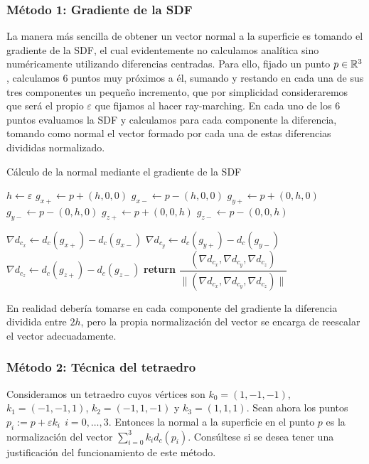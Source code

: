 \subsubsection{Método 1: Gradiente de la SDF}

La manera más sencilla de obtener un vector normal a la superficie es tomando el gradiente de la SDF, el cual evidentemente no calculamos analítica sino numéricamente utilizando diferencias centradas. Para ello, fijado un punto $p\in\mathbb{R}^3$, calculamos 6 puntos muy próximos a él, sumando y restando en cada una de sus tres componentes un pequeño incremento, que por simplicidad consideraremos que será el propio $\varepsilon$ que fijamos al hacer ray-marching. En cada uno de los 6 puntos evaluamos la SDF y calculamos para cada componente la diferencia, tomando como normal el vector formado por cada una de estas diferencias divididas normalizado.

\begin{algorithm}[H]
    \caption{Cálculo de la normal mediante el gradiente de la SDF} \label{alg:normal-gradiente-sdf}
    \begin{algorithmic}
    \State $h\gets\varepsilon$
    \State $g_{x+}\gets p + (h,0,0)$
    \State $g_{x-}\gets p - (h,0,0)$
    \State $g_{y+}\gets p + (0,h,0)$
    \State $g_{y-}\gets p - (0,h,0)$
    \State $g_{z+}\gets p + (0,0,h)$
    \State $g_{z-}\gets p - (0,0,h)$

    \State $\nabla d_{c_x} \gets d_c(g_{x+})-d_c(g_{x-})$
    \State $\nabla d_{c_y} \gets d_c(g_{y+})-d_c(g_{y-})$
    \State $\nabla d_{c_z} \gets d_c(g_{z+})-d_c(g_{z-})$
        \State \textbf{return} $\dfrac{(\nabla d_{c_x},\nabla d_{c_y},\nabla d_{c_z})}{\|(\nabla d_{c_x},\nabla d_{c_y},\nabla d_{c_z})\|}$
    \end{algorithmic}
\end{algorithm}

En realidad debería tomarse en cada componente del gradiente la diferencia dividida entre $2h$, pero la propia normalización del vector se encarga de reescalar el vector adecuadamente.    

\subsubsection{Método 2: Técnica del tetraedro}

Consideramos un tetraedro cuyos vértices son $k_0=(1,-1,-1)$, $k_1=(-1,-1,1)$, $k_2=(-1,1,-1)$ y $k_3=(1,1,1)$. Sean ahora los puntos $p_i := p+\varepsilon k_i\ \ i=0,\dots,3$. Entonces la normal a la superficie en el punto $p$ es la normalización del vector $\sum_{i=0}^3 k_i d_c(p_i)$. Consúltese \cite{normals-sdf} si se desea tener una justificación del funcionamiento de este método.

